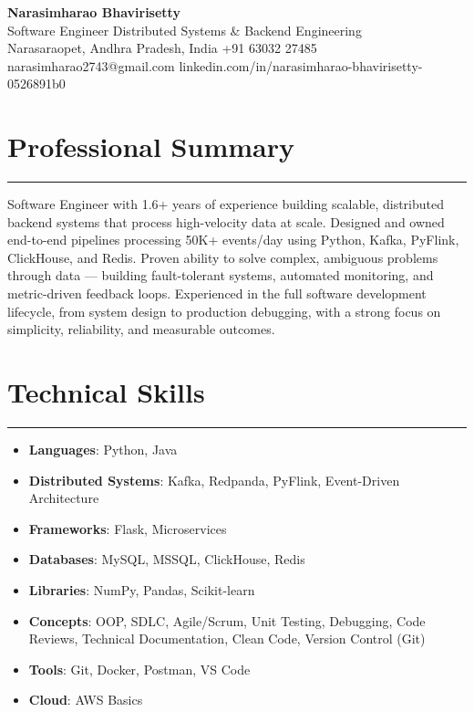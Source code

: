 \documentclass[12pt]{article}
\begin{document}
\begin{center}
  {\huge\textbf{Narasimharao Bhavirisetty}}\\[3pt]
  Software Engineer \textbullet{} Distributed Systems \& Backend Engineering \\[3pt]
  Narasaraopet, Andhra Pradesh, India \textbullet{} +91 63032 27485 \textbullet{} narasimharao2743@gmail.com \textbullet{} linkedin.com/in/narasimharao-bhavirisetty-0526891b0
\end{center}

\vspace{6pt}

\section*{Professional Summary}
\vspace{1pt}\hrule\vspace{4pt}
Software Engineer with 1.6+ years of experience building scalable, distributed backend systems that process high-velocity data at scale. Designed and owned end-to-end pipelines processing 50K+ events/day using Python, Kafka, PyFlink, ClickHouse, and Redis. Proven ability to solve complex, ambiguous problems through data — building fault-tolerant systems, automated monitoring, and metric-driven feedback loops. Experienced in the full software development lifecycle, from system design to production debugging, with a strong focus on simplicity, reliability, and measurable outcomes.

\section*{Technical Skills}
\vspace{1pt}\hrule\vspace{4pt}
\begin{itemize}
  \item \textbf{Languages}: Python, Java
  \item \textbf{Distributed Systems}: Kafka, Redpanda, PyFlink, Event-Driven Architecture
  \item \textbf{Frameworks}: Flask, Microservices
  \item \textbf{Databases}: MySQL, MSSQL, ClickHouse, Redis
  \item \textbf{Libraries}: NumPy, Pandas, Scikit-learn
  \item \textbf{Concepts}: OOP, SDLC, Agile/Scrum, Unit Testing, Debugging, Code Reviews, Technical Documentation, Clean Code, Version Control (Git)
  \item \textbf{Tools}: Git, Docker, Postman, VS Code
  \item \textbf{Cloud}: AWS Basics
\end{itemize}
\end{document}
